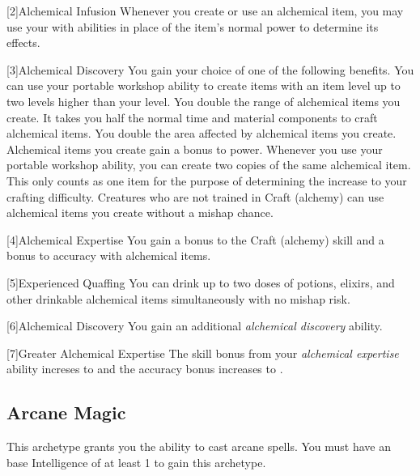         [2]{Alchemical Infusion} Whenever you create or use an alchemical item, you may use your  with  abilities in place of the item's normal power to determine its effects.

        [3]{Alchemical Discovery} You gain your choice of one of the following benefits.
        {
             You can use your portable workshop ability to create items with an item level up to two levels higher than your level.
             You double the range of alchemical items you create.
             It takes you half the normal time and material components to craft alchemical items.
             You double the area affected by alchemical items you create.
             Alchemical items you create gain a  bonus to power.
             Whenever you use your portable workshop ability, you can create two copies of the same alchemical item.
            This only counts as one item for the purpose of determining the increase to your crafting difficulty.
             Creatures who are not trained in Craft (alchemy) can use alchemical items you create without a mishap chance.
        }

        [4]{Alchemical Expertise} You gain a  bonus to the Craft (alchemy) skill and a  bonus to accuracy with alchemical items.

        [5]{Experienced Quaffing} You can drink up to two doses of potions, elixirs, and other drinkable alchemical items simultaneously with no mishap risk.

        [6]{Alchemical Discovery} You gain an additional \textit{alchemical discovery} ability.

        [7]{Greater Alchemical Expertise} The skill bonus from your \textit{alchemical expertise} ability increses to  and the accuracy bonus increases to .

    \subsection{Arcane Magic}
        This archetype grants you the ability to cast arcane spells.
        You must have an base Intelligence of at least 1 to gain this archetype.

